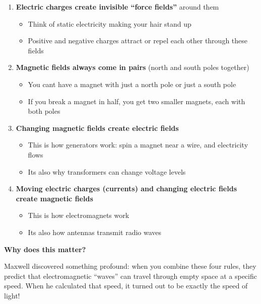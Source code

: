 \begin{enumerate}
\def\labelenumi{\arabic{enumi}.}
\tightlist
\item
  \textbf{Electric charges create invisible ``force fields''} around
  them

  \begin{itemize}
  \tightlist
  \item
    Think of static electricity making your hair stand up
  \item
    Positive and negative charges attract or repel each other through
    these fields
  \end{itemize}
\item
  \textbf{Magnetic fields always come in pairs} (north and south poles
  together)

  \begin{itemize}
  \tightlist
  \item
    You can\textquotesingle t have a magnet with just a north pole or
    just a south pole
  \item
    If you break a magnet in half, you get two smaller magnets, each
    with both poles
  \end{itemize}
\item
  \textbf{Changing magnetic fields create electric fields}

  \begin{itemize}
  \tightlist
  \item
    This is how generators work: spin a magnet near a wire, and
    electricity flows
  \item
    It\textquotesingle s also why transformers can change voltage levels
  \end{itemize}
\item
  \textbf{Moving electric charges (currents) and changing electric
  fields create magnetic fields}

  \begin{itemize}
  \tightlist
  \item
    This is how electromagnets work
  \item
    It\textquotesingle s also how antennas transmit radio waves
  \end{itemize}
\end{enumerate}

\textbf{Why does this matter?}

Maxwell discovered something profound: when you combine these four
rules, they predict that electromagnetic ``waves'' can travel through
empty space at a specific speed. When he calculated that speed, it
turned out to be exactly the speed of light!

